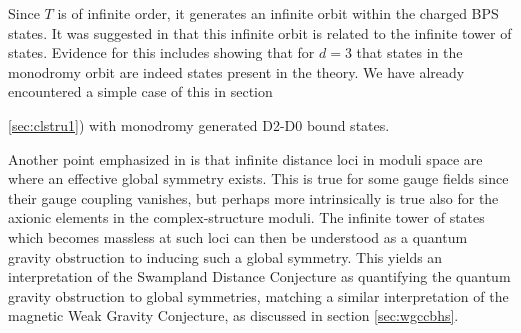 \documentclass[11pt,a4paper]{article}
\numberwithin{equation}{section}
\numberwithin{table}{section}\setlength{\multlinegap}{25pt}
\begin{document}
Since $T$ is of infinite order, it generates an infinite orbit within the charged BPS states. It was suggested in \cite{Grimm:2018ohb} that this infinite orbit is related to the infinite tower of states. Evidence for this includes showing that for $d=3$ that states in the monodromy orbit are indeed states present in the theory. We have already encountered a simple case of this in section {\ref{sec:clstru1}) with monodromy generated D2-D0 bound states. 

Another point emphasized in \cite{Grimm:2018ohb} is that infinite distance loci in moduli space are where an effective global symmetry exists. This is true for some gauge fields since their gauge coupling vanishes, but perhaps more intrinsically is true also for the axionic elements in the complex-structure moduli. The infinite tower of states which becomes massless at such loci can then be understood as a quantum gravity obstruction to inducing such a global symmetry. This yields an interpretation of the Swampland Distance Conjecture as quantifying the quantum gravity obstruction to global symmetries, matching a similar interpretation of the magnetic Weak Gravity Conjecture, as discussed in section \ref{sec:wgccbhs}. 

}
\end{document}
